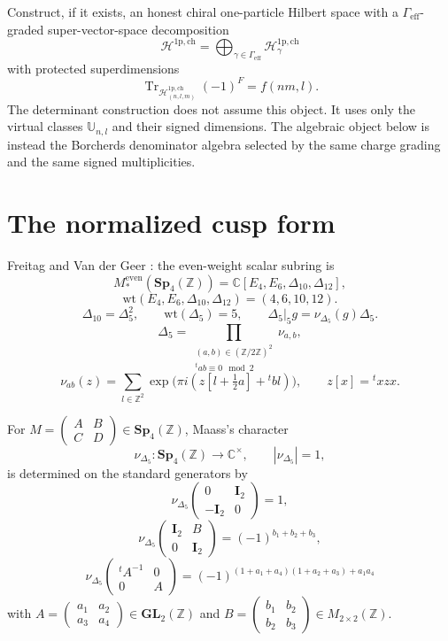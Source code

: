 \documentclass[11pt]{memoir}
\newcommand{\Z}{\mathbb{Z}} \newcommand{\C}{\mathbb{C}}
\newcommand{\Sp}{\mathbf{Sp}}
\newcommand{\GL}{\mathbf{GL}}
\newcommand{\Id}{\mathbf{I}}
\begin{document}
\begin{openproblem}
Construct, if it exists, an honest chiral one-particle Hilbert space
with a $\Gamma_{\mathrm{eff}}$-graded super-vector-space decomposition
$$
\mathcal H^{\mathrm{1p,ch}}
=\bigoplus_{\gamma\in\Gamma_{\mathrm{eff}}}
\mathcal H^{\mathrm{1p,ch}}_\gamma
$$
with protected superdimensions
$$
\operatorname{Tr}_{\mathcal H^{\mathrm{1p,ch}}_{(n,l,m)}}(-1)^F
=f(nm,l).
$$
The determinant construction does not assume this object.  It uses only
the virtual classes $\mathbb U_{n,l}$ and their signed dimensions.  The
algebraic object below is instead the Borcherds denominator algebra
selected by the same charge grading and the same signed multiplicities.
\end{openproblem}

\section{The normalized cusp form}

Freitag \cite{FREITAG:1} and Van der Geer \cite{VDGEER:1}: the
even-weight scalar subring is
$$M^{\mathrm{even}}_*(\Sp_4(\Z)) = \C[E_4,E_6,\Delta_{10},\Delta_{12}],$$
$$\mathrm{wt}(E_4,E_6,\Delta_{10},\Delta_{12})=(4,6,10,12).$$
$$\Delta_{10}=\Delta_5^2,\qquad
\mathrm{wt}(\Delta_5)=5,\qquad
\Delta_5|_5 g=\nu_{\Delta_5}(g)\Delta_5.$$
$$\Delta_5 =
\prod_{\substack{(a,b)\in (\Z/2\Z)^2\\{}^t ab\equiv 0 \mod 2}}
\nu_{a,b},$$
$$\nu_{ab}(z)=
\sum_{l\in\Z^2}\exp\bigl(\pi i(z[l+\tfrac12a]+{}^tbl)\bigr),
\qquad z[x]={}^txzx.$$

For $M = \begin{pmatrix} A & B\\ C & D\end{pmatrix}
\in \Sp_4(\Z)$, Maass's character \cite{MAASS:1}
$$\nu_{\Delta_5}:\Sp_4(\Z)\rightarrow \C^\times,\qquad
|\nu_{\Delta_5}|=1,$$
is determined on the standard generators by
$$\nu_{\Delta_5}\begin{pmatrix}0 & \Id_2\\
-\Id_2 & 0\end{pmatrix} = 1,$$ $$\nu_{\Delta_5}\begin{pmatrix}\Id_2 & B\\
0 & \Id_2\end{pmatrix} = (-1)^{b_1 + b_2 + b_3},$$
$$\nu_{\Delta_5}\begin{pmatrix}{}^tA^{-1} & 0\\
0 & A\end{pmatrix} = (-1)^{(1 + a_1 + a_4)(1 + a_2 + a_3) + a_1a_4}$$
with $A = \begin{pmatrix}a_1 & a_2\\
a_3 & a_4\end{pmatrix} \in \GL_2(\Z)$ and $B = \begin{pmatrix}b_1 &
b_2\\
b_2 & b_3\end{pmatrix} \in M_{2\times2}(\Z).$
\end{document}
